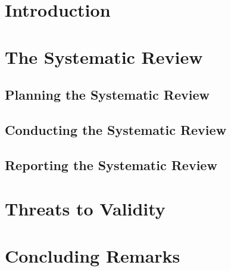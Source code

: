 \documentclass{sig-alternate}
\begin{document}
\linespread{0.95}



\linespread{0.95}
\section{Introduction}
	

%	
%		
	
\linespread{0.95}
\section{The Systematic Review}\label{method}
	
	\subsection{Planning the Systematic Review\label{planning}}
		
	\subsection{Conducting the Systematic Review\label{conducting}}
		
%			
	\subsection{Reporting the Systematic Review\label{reporting}}
		
\linespread{0.95}	
\section{Threats to Validity}\label{threats}
		
		
%	
\linespread{0.95}			
\section{Concluding Remarks}\label{conclusion}
		

%	      
	
\linespread{0.95}
		

\end{document}
